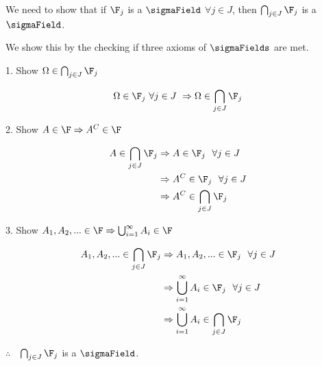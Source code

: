 \newcommand{\capFj}{\bigcap_{j\in J} \F_j}

We need to show that if $\F_j$ is a $\sigmaField$ $\forall j \in J$,
then $\capFj$ is a $\sigmaField$.

We show this by the checking if three axioms of $\sigmaFields$ are met. 

1. Show $\Omega\in\capFj$ 

$$
\Omega \in \F_j ~\forall j\in J~ \Rightarrow \Omega \in \capFj
$$

2. Show $A \in \F \Rightarrow A^C \in \F$ 

\begin{align*}
A \in \capFj &\Rightarrow A \in \F_j ~~\forall j\in J \\
&\Rightarrow A^C \in \F_j ~~\forall j\in J \\
&\Rightarrow A^C \in \capFj \\
\end{align*}

3. Show $A_1, A_2, ... \in \F \Rightarrow \bigcup_{i=1}^\infty A_i \in \F$

\begin{align*}
A_1, A_2, ... \in \capFj &\Rightarrow A_1, A_2, ... \in \F_j ~~\forall j\in J \\
&\Rightarrow \bigcup_{i=1}^\infty A_i \in \F_j ~~\forall j \in J \\
&\Rightarrow \bigcup_{i=1}^\infty A_i \in \capFj
\end{align*}

$\therefore$ $~~\capFj$ is a $\sigmaField$.
